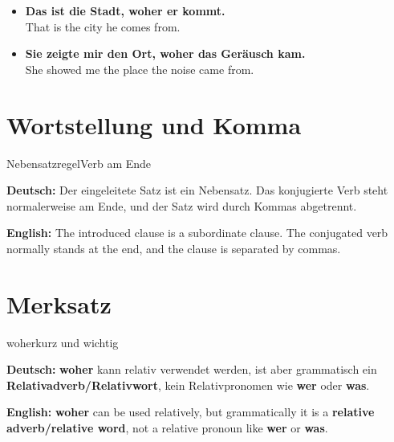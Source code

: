 \documentclass[a4paper,11pt]{article}
\newcommand{\GermanText}[1]{\textbf{Deutsch: }#1\par}
\newcommand{\EnglishText}[1]{{\small\color{SoftGray}\textbf{English: }#1\par}}
\newcommand{\ExampleItem}[2]{\item \textbf{#1}\\{\small\color{SoftGray}#2}}
\begin{document}
\begin{exbox}

\begin{itemize}

\ExampleItem{Das ist die Stadt, woher er kommt.}{That is the city he comes from.}

\ExampleItem{Sie zeigte mir den Ort, woher das Geräusch kam.}{She showed me the place the noise came from.}

\end{itemize}

\end{exbox}

\section{Wortstellung und Komma}

\begin{grammarentry}{Nebensatzregel}{Verb am Ende}

\GermanText{Der eingeleitete Satz ist ein Nebensatz. Das konjugierte Verb steht normalerweise am Ende, und der Satz wird durch Kommas abgetrennt.}

\EnglishText{The introduced clause is a subordinate clause. The conjugated verb normally stands at the end, and the clause is separated by commas.}

\end{grammarentry}

\section{Merksatz}

\begin{grammarentry}{woher}{kurz und wichtig}

\GermanText{\textbf{woher} kann relativ verwendet werden, ist aber grammatisch ein \textbf{Relativadverb/Relativwort}, kein Relativpronomen wie \textbf{wer} oder \textbf{was}.}

\EnglishText{\textbf{woher} can be used relatively, but grammatically it is a \textbf{relative adverb/relative word}, not a relative pronoun like \textbf{wer} or \textbf{was}.}

\end{grammarentry}
\end{document}
